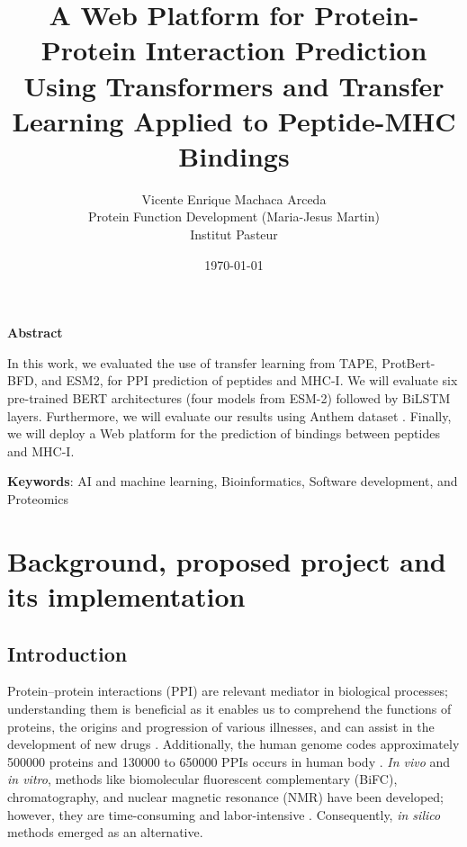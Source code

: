 \documentclass[a4paper,11pt]{article}
\title{ A Web Platform for Protein-Protein Interaction Prediction Using Transformers and Transfer Learning Applied to Peptide-MHC Bindings }
\author{Vicente Enrique Machaca Arceda \\ Protein Function Development (Maria-Jesus Martin) \\ Institut Pasteur}
\date{\today}
\begin{document}
	
\maketitle
	
\begin{center}
	\begin{large}
		\textbf{Abstract}
	\end{large} 

	\vspace{0.3cm}
	
	In this work, we evaluated the use of transfer learning from TAPE, ProtBert-BFD, and ESM2, for PPI prediction of peptides and MHC-I. We will evaluate six pre-trained BERT architectures (four models from ESM-2) followed by  BiLSTM layers. Furthermore, we will evaluate our results using Anthem  dataset \cite{mei2021anthem}. Finally, we will deploy a Web platform for the prediction of bindings between peptides and MHC-I.
	

\end{center}
	
\textbf{Keywords}: 	AI and machine learning, Bioinformatics, Software development, and Proteomics
	
	

\section{Background, proposed project and its implementation}

\subsection{Introduction}

Protein–protein interactions (PPI) are relevant mediator in biological processes; understanding  them is beneficial as it enables us to comprehend the functions of proteins, the origins and progression of various illnesses, and can assist in the development of new drugs  \cite{hu2022deep,jha2023prediction}. Additionally, the human genome codes approximately 500000 proteins and 130000 to 650000 PPIs occurs in human body \cite{hu2022deep}. \textit{In vivo} and \textit{in vitro}, methods like biomolecular fluorescent complementary (BiFC), chromatography, and nuclear magnetic resonance (NMR) have been developed; however, they are time-consuming and labor-intensive \cite{rao2014protein,hu2022deep}. Consequently, \textit{in silico} methods  emerged as an alternative.\\
\end{document}
